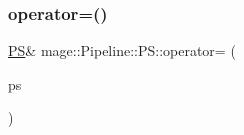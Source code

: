 \hypertarget{structmage_1_1_pipeline_1_1_p_s_a93e966d5d82fa9dec57f08fcf35cb294}{}\label{structmage_1_1_pipeline_1_1_p_s_a93e966d5d82fa9dec57f08fcf35cb294} 
\subsubsection{\texorpdfstring{operator=()}{operator=()}\hspace{0.1cm}{\footnotesize\ttfamily [2/2]}}
{\footnotesize\ttfamily \hyperlink{structmage_1_1_pipeline_1_1_p_s}{PS}\& mage\+::\+Pipeline\+::\+P\+S\+::operator= (\begin{DoxyParamCaption}\item[{\hyperlink{structmage_1_1_pipeline_1_1_p_s}{PS} \&\&}]{ps }\end{DoxyParamCaption})\hspace{0.3cm}{\ttfamily [delete]}}

